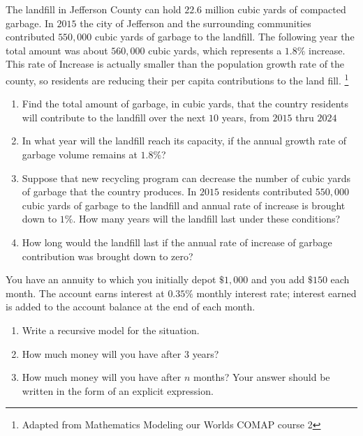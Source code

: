 \documentclass[10pt,]{book}
\theoremstyle{ptxdefinitionnotitle}
\theoremstyle{ptxdefinitiontitle}
\theoremstyle{ptxdefinitionnotitle}
\theoremstyle{ptxdefinitiontitle}
\theoremstyle{ptxdefinitionnotitle}
\theoremstyle{ptxdefinitiontitle}
\numberwithin{equation}{section}
\begin{document}
\begin{divisionexercise}{11}\hypertarget{exercise-42}{}
\hypertarget{p-183}{}%
The landfill in Jefferson County can hold \(22.6\) million cubic yards of compacted garbage. In \(2015\) the city of Jefferson and the surrounding communities contributed \(550,000\) cubic yards of garbage to the landfill. The following year the total amount was about \(560,000\) cubic yards, which represents a \(1.8\%\) increase. This rate of Increase is actually smaller than the population growth rate of the county, so residents are reducing their per capita contributions to the land fill. \footnote{Adapted from Mathematics Modeling our Worlds COMAP course 2\label{fn-2}}%
\leavevmode%
\begin{enumerate}[label=(\alph*)]
\item\hypertarget{li-90}{}Find the total amount of garbage, in cubic yards, that the country residents will contribute to the landfill over the next \(10\) years, from \(2015\) thru \(2024\)%
\item\hypertarget{li-91}{}In what year will the landfill reach its capacity, if the annual growth rate of garbage volume remains at \(1.8\%\)?%
\item\hypertarget{li-92}{}Suppose that new recycling program can decrease the number of cubic yards of garbage that the country produces. In \(2015\) residents contributed \(550,000\) cubic yards of garbage to the landfill and annual rate of increase is brought down to \(1\%\).  How many years will the landfill last under these conditions?%
\item\hypertarget{li-93}{}How long would the landfill last if the annual rate of increase of garbage contribution was brought down to zero?%
\end{enumerate}
\end{divisionexercise}%
\begin{divisionexercise}{12}\hypertarget{exercise-43}{}
\hypertarget{p-184}{}%
You have an annuity to which you initially depot \(\$1,000\) and you add \(\$150\) each month. The account earns interest at \(0.35\%\) monthly interest rate; interest earned is added to the account balance at the end of each month.%
\leavevmode%
\begin{enumerate}[label=(\alph*)]
\item\hypertarget{li-94}{}Write a recursive model for the situation.%
\item\hypertarget{li-95}{}How much money will you have after \(3\) years?%
\item\hypertarget{li-96}{}How much money will you have after \(n\) months? Your answer should be written in the form of an explicit expression.%
\end{enumerate}
\end{divisionexercise}%
\end{document}
